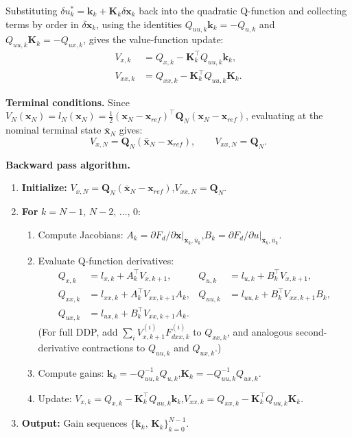Substituting $\delta u_k^* = \mathbf{k}_k + \mathbf{K}_k\delta\mathbf{x}_k$ back into the quadratic Q-function and collecting terms by order in $\delta\mathbf{x}_k$, using the identities $Q_{uu,k}\mathbf{k}_k = -Q_{u,k}$ and $Q_{uu,k}\mathbf{K}_k = -Q_{ux,k}$, gives the value-function update:
\begin{align}
    V_{x,k} &= Q_{x,k} - \mathbf{K}_k^\top Q_{uu,k}\mathbf{k}_k, \\
    V_{xx,k} &= Q_{xx,k} - \mathbf{K}_k^\top Q_{uu,k}\mathbf{K}_k.
\end{align}

\textbf{Terminal conditions.} Since $V_N(\mathbf{x}_N) = l_N(\mathbf{x}_N) = \frac{1}{2}(\mathbf{x}_N - \mathbf{x}_{ref})^\top\mathbf{Q}_N(\mathbf{x}_N - \mathbf{x}_{ref})$, evaluating at the nominal terminal state $\bar{\mathbf{x}}_N$ gives:
\begin{equation}
    V_{x,N} = \mathbf{Q}_N(\bar{\mathbf{x}}_N - \mathbf{x}_{ref}), \qquad V_{xx,N} = \mathbf{Q}_N.
\end{equation}

\textbf{Backward pass algorithm.}
\begin{enumerate}
    \item \textbf{Initialize:} $V_{x,N} = \mathbf{Q}_N(\bar{\mathbf{x}}_N - \mathbf{x}_{ref})$,\quad $V_{xx,N} = \mathbf{Q}_N$.
    \item \textbf{For} $k = N-1,\, N-2,\, \ldots,\, 0$:
    \begin{enumerate}
        \item Compute Jacobians: $A_k = \partial F_d/\partial\mathbf{x}\big|_{\bar{\mathbf{x}}_k,\bar{u}_k}$,\quad $B_k = \partial F_d/\partial u\big|_{\bar{\mathbf{x}}_k,\bar{u}_k}$.
        \item Evaluate Q-function derivatives:
        \begin{align*}
            Q_{x,k} &= l_{x,k} + A_k^\top V_{x,k+1}, &
            Q_{u,k} &= l_{u,k} + B_k^\top V_{x,k+1},\\
            Q_{xx,k} &= l_{xx,k} + A_k^\top V_{xx,k+1}A_k, &
            Q_{uu,k} &= l_{uu,k} + B_k^\top V_{xx,k+1}B_k,\\
            Q_{ux,k} &= l_{ux,k} + B_k^\top V_{xx,k+1}A_k.
        \end{align*}
        (For full DDP, add $\sum_i V_{x,k+1}^{(i)}F_{dxx,k}^{(i)}$ to $Q_{xx,k}$, and analogous second-derivative contractions to $Q_{uu,k}$ and $Q_{ux,k}$.)
        \item Compute gains: $\mathbf{k}_k = -Q_{uu,k}^{-1}Q_{u,k}$,\quad $\mathbf{K}_k = -Q_{uu,k}^{-1}Q_{ux,k}$.
        \item Update: $V_{x,k} = Q_{x,k} - \mathbf{K}_k^\top Q_{uu,k}\mathbf{k}_k$,\quad $V_{xx,k} = Q_{xx,k} - \mathbf{K}_k^\top Q_{uu,k}\mathbf{K}_k$.
    \end{enumerate}
    \item \textbf{Output:} Gain sequences $\{\mathbf{k}_k,\, \mathbf{K}_k\}_{k=0}^{N-1}$.
\end{enumerate}

